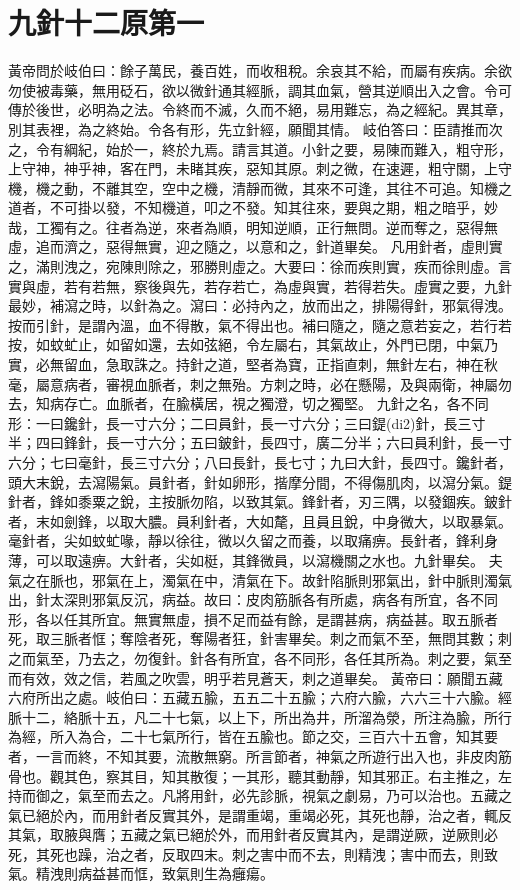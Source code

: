 \section{九針十二原第一}

黃帝問於岐伯曰：餘子萬民，養百姓，而收租稅。余哀其不給，而屬有疾病。余欲勿使被毒藥，無用砭石，欲以微針通其經脈，調其血氣，營其逆順出入之會。令可傳於後世，必明為之法。令終而不滅，久而不絕，易用難忘，為之經紀。異其章，別其表裡，為之終始。令各有形，先立針經，願聞其情。
岐伯答曰：臣請推而次之，令有綱紀，始於一，終於九焉。請言其道。小針之要，易陳而難入，粗守形，上守神，神乎神，客在門，未睹其疾，惡知其原。刺之微，在速遲，粗守關，上守機，機之動，不離其空，空中之機，清靜而微，其來不可逢，其往不可追。知機之道者，不可掛以發，不知機道，叩之不發。知其往來，要與之期，粗之暗乎，妙哉，工獨有之。往者為逆，來者為順，明知逆順，正行無問。逆而奪之，惡得無虛，追而濟之，惡得無實，迎之隨之，以意和之，針道畢矣。
凡用針者，虛則實之，滿則洩之，宛陳則除之，邪勝則虛之。大要曰：徐而疾則實，疾而徐則虛。言實與虛，若有若無，察後與先，若存若亡，為虛與實，若得若失。虛實之要，九針最妙，補瀉之時，以針為之。瀉曰：必持內之，放而出之，排陽得針，邪氣得洩。按而引針，是謂內溫，血不得散，氣不得出也。補曰隨之，隨之意若妄之，若行若按，如蚊虻止，如留如還，去如弦絕，令左屬右，其氣故止，外門已閉，中氣乃實，必無留血，急取誅之。持針之道，堅者為寶，正指直刺，無針左右，神在秋毫，屬意病者，審視血脈者，刺之無殆。方刺之時，必在懸陽，及與兩衛，神屬勿去，知病存亡。血脈者，在腧橫居，視之獨澄，切之獨堅。
九針之名，各不同形：一曰鑱針，長一寸六分；二曰員針，長一寸六分；三曰鍉(di2)針，長三寸半；四曰鋒針，長一寸六分；五曰鈹針，長四寸，廣二分半；六曰員利針，長一寸六分；七曰毫針，長三寸六分；八曰長針，長七寸；九曰大針，長四寸。鑱針者，頭大末銳，去瀉陽氣。員針者，針如卵形，揩摩分間，不得傷肌肉，以瀉分氣。鍉針者，鋒如黍粟之銳，主按脈勿陷，以致其氣。鋒針者，刃三隅，以發錮疾。鈹針者，末如劍鋒，以取大膿。員利針者，大如氂，且員且銳，中身微大，以取暴氣。毫針者，尖如蚊虻喙，靜以徐往，微以久留之而養，以取痛痹。長針者，鋒利身薄，可以取遠痹。大針者，尖如梃，其鋒微員，以瀉機關之水也。九針畢矣。
夫氣之在脈也，邪氣在上，濁氣在中，清氣在下。故針陷脈則邪氣出，針中脈則濁氣出，針太深則邪氣反沉，病益。故曰：皮肉筋脈各有所處，病各有所宜，各不同形，各以任其所宜。無實無虛，損不足而益有餘，是謂甚病，病益甚。取五脈者死，取三脈者恇；奪陰者死，奪陽者狂，針害畢矣。刺之而氣不至，無問其數；刺之而氣至，乃去之，勿復針。針各有所宜，各不同形，各任其所為。刺之要，氣至而有效，效之信，若風之吹雲，明乎若見蒼天，刺之道畢矣。
黃帝曰：願聞五藏六府所出之處。岐伯曰：五藏五腧，五五二十五腧；六府六腧，六六三十六腧。經脈十二，絡脈十五，凡二十七氣，以上下，所出為井，所溜為滎，所注為腧，所行為經，所入為合，二十七氣所行，皆在五腧也。節之交，三百六十五會，知其要者，一言而終，不知其要，流散無窮。所言節者，神氣之所遊行出入也，非皮肉筋骨也。觀其色，察其目，知其散復；一其形，聽其動靜，知其邪正。右主推之，左持而御之，氣至而去之。凡將用針，必先診脈，視氣之劇易，乃可以治也。五藏之氣已絕於內，而用針者反實其外，是謂重竭，重竭必死，其死也靜，治之者，輒反其氣，取腋與膺；五藏之氣已絕於外，而用針者反實其內，是謂逆厥，逆厥則必死，其死也躁，治之者，反取四末。刺之害中而不去，則精洩；害中而去，則致氣。精洩則病益甚而恇，致氣則生為癰瘍。

